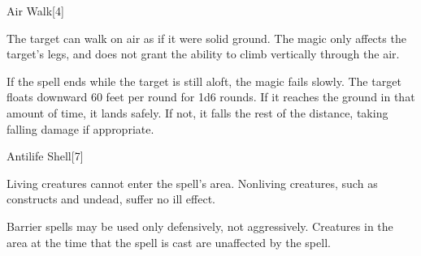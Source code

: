\begin{spellsection}{Air Walk}[4]
    \begin{spellheader}
    \end{spellheader}
    \begin{spellcontent}
        \begin{spelltargetinginfo}
        \end{spelltargetinginfo}
        \begin{spelleffects}
            \spelleffect The target can walk on air as if it were solid ground. The magic only affects the target's legs, and does not grant the ability to climb vertically through the air.
            \par If the spell ends while the target is still aloft, the magic fails slowly. The target floats downward 60 feet per round for 1d6 rounds. If it reaches the ground in that amount of time, it lands safely. If not, it falls the rest of the distance, taking falling damage if appropriate.
            \spelldur \durshort
        \end{spelleffects}
    \end{spellcontent}
    \begin{spellfooter}
        \miscastexplode
    \end{spellfooter}
\end{spellsection}

\begin{spellsection}{Antilife Shell}[7]
    \begin{spellheader}
    \end{spellheader}
    \begin{spellcontent}
        \begin{spelltargetinginfo}
        \end{spelltargetinginfo}
        \begin{spelleffects}
            \spelleffect Living creatures cannot enter the spell's area. Nonliving creatures, such as constructs and undead, suffer no ill effect.
            \spelldur \durmed \dismissable
        \end{spelleffects}
    \end{spellcontent}
    \begin{spellfooter}
        \spellnotes Barrier spells may be used only defensively, not aggressively. Creatures in the area at the time that the spell is cast are unaffected by the spell.
        \miscastexplode
    \end{spellfooter}
\end{spellsection}


